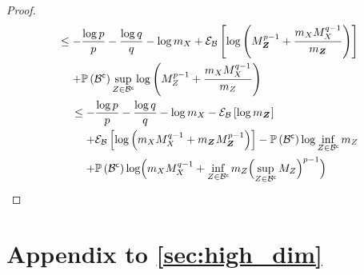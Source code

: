 \begin{proof}
\begin{align*}
		\begin{split}
			& \leq -\frac{\log p}{p}-\frac{\log q}{q}-\log m_{\states{}}+\partialexpectation{\log\left( M_{\observationsRV{}}^{p-1}+\frac{m_{\states{}}M_{\states{}}^{q-1}}{m_{\observationsRV{}}}\right)}{\subSpace}                                        \\
			& \phantomeq+\measure{\stcomp{\subSpace}}\sup_{\observations{}\in\stcomp{\subSpace}}\log\left( M_{\observations{}}^{p-1}+\frac{m_{\states{}}M_{\states{}}^{q-1}}{m_{\observations{}}}\right)
		\end{split} \\
		\begin{split}
			& \leq-\frac{\log p}{p}-\frac{\log q}{q}-\log m_{\states{}}-\partialexpectation{\log m_{\observationsRV{}}}{\subSpace}\\
			&\phantomeq+\partialexpectation{\log\left(m_{\states{}}M_{\states{}}^{q-1}+m_{\observationsRV{}}M_{\observationsRV{}}^{p-1}\right)}{\subSpace}
			-\measure{\stcomp{\subSpace}}\log\inf_{\observations{}\in\stcomp{\subSpace}}m_{\observations{}}\\
			& \phantomeq+\measure{\stcomp{\subSpace}}\log\Bigl( m_{\states{}}M_{\states{}}^{q-1}
			+\inf_{\observations{}\in\stcomp{\subSpace}}m_{\observations{}}\Bigl(\sup_{\observations{}\in\stcomp{\subSpace}}M_{\observations{}}\Bigr)^{p-1}\Bigr)
		\end{split}
	\end{align*}
\end{proof}

\section{Appendix to \cref{sec:high_dim}}

